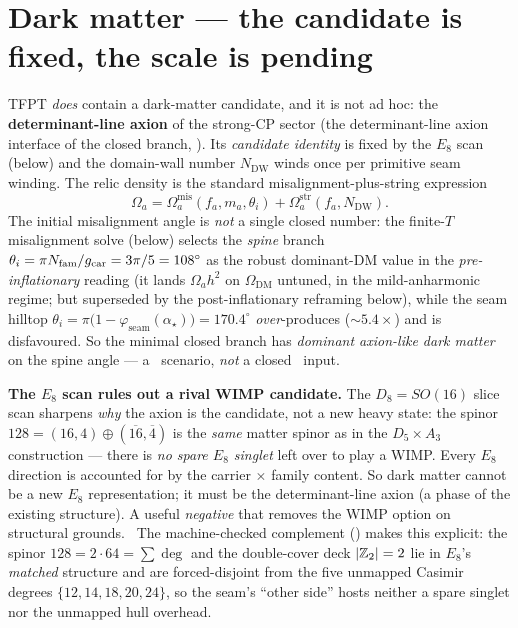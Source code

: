 \section{Dark matter --- the candidate is fixed, the scale is pending}
TFPT \emph{does} contain a dark-matter candidate, and it is not ad hoc: the \textbf{determinant-line
axion} of the strong-CP sector (the determinant-line axion interface of the closed branch, \mE). Its
\emph{candidate identity} is fixed by the $E_8$ scan (below) and the domain-wall number $N_{\mathrm{DW}}$
winds once per primitive seam winding. The relic density is the standard misalignment-plus-string
expression
\[
  \Omega_a=\Omega_a^{\mathrm{mis}}(f_a,m_a,\theta_i)+\Omega_a^{\mathrm{str}}(f_a,N_{\mathrm{DW}}).
\]
The initial misalignment angle is \emph{not} a single closed number: the finite-$T$ misalignment solve
(below) selects the \emph{spine} branch $\theta_i=\pi N_{\mathrm{fam}}/g_{\mathrm{car}}=3\pi/5=108^\circ$ as the
robust dominant-DM value in the \emph{pre-inflationary} reading (it lands $\Omega_a h^2$ on $\Omega_{\mathrm{DM}}$ untuned, in the mild-anharmonic
regime; but superseded by the post-inflationary reframing below), while the seam hilltop $\theta_i=\pi\bigl(1-\varphi_{\mathrm{seam}}(\alpha_\star)\bigr)=170.4^\circ$
\emph{over}-produces (${\sim}5.4\times$) and is disfavoured. So the minimal closed branch has
\emph{dominant axion-like dark matter} on the spine angle --- a \mC\ scenario, \emph{not} a closed \mE\ input.

\par\smallskip\noindent\textbf{The $E_8$ scan rules out a rival WIMP candidate.}
The $D_8=SO(16)$ slice scan sharpens \emph{why} the axion is the candidate, not a new heavy state: the
spinor $128=(16,4)\oplus(\overline{16},\overline4)$ is the \emph{same} matter spinor as in the
$D_5\times A_3$ construction --- there is \emph{no spare $E_8$ singlet} left over to play a WIMP. Every
$E_8$ direction is accounted for by the carrier $\times$ family content. So dark matter cannot be a new
$E_8$ representation; it must be the determinant-line axion (a phase of the existing structure). A useful
\emph{negative} that removes the WIMP option on structural grounds. \mE\ The machine-checked complement
() makes this explicit: the spinor $128=2\cdot64=\sum\deg$ and the
double-cover deck $|\mathbb{Z}_2|=2$ lie in $E_8$'s \emph{matched} structure and are forced-disjoint from the five
unmapped Casimir degrees $\{12,14,18,20,24\}$, so the seam's ``other side'' hosts neither a spare singlet nor
the unmapped hull overhead.

